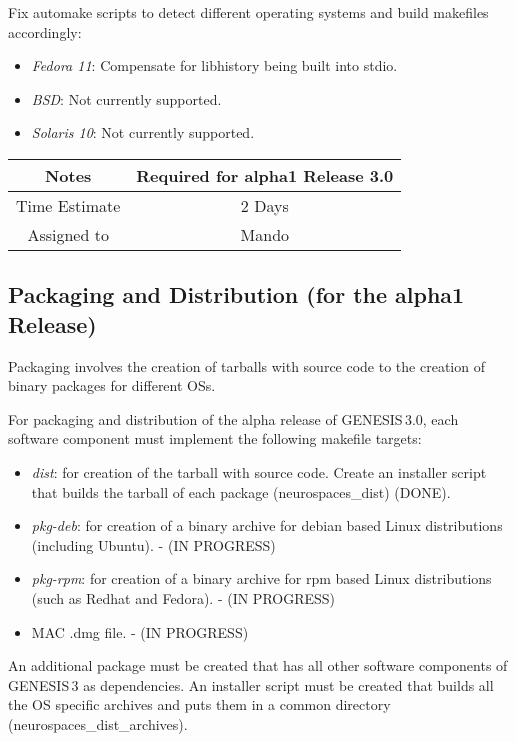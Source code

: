 \documentclass[12pt]{article}
\begin{document}
Fix automake scripts to detect different operating systems 
and build makefiles accordingly:


\begin{itemize}
\item {\it Fedora 11}: Compensate for libhistory being built into stdio.
\item {\it BSD}: Not currently supported.
\item {\it Solaris 10}: Not currently supported.
\end{itemize}

{
  \vspace{5mm}
  \centering
  \begin{tabular}{|c|c|}
    \hline
    Notes
    & Required for alpha1 Release 3.0 \\
    \hline
    Time Estimate
    & 2 Days\\
    \hline
    Assigned to
    & Mando \\
    \hline
  \end{tabular}
}


\subsection{Packaging and Distribution (for the alpha1 Release)}

Packaging involves the creation of tarballs with source code to the
creation of binary packages for different OSs.

For packaging and distribution of the alpha release of GENESIS\,3.0,
each software component must implement the following makefile targets:

\begin{itemize}
\item {\it dist}: for creation of the tarball with source code.
  Create an installer script that builds the tarball of each package
  (neurospaces\_dist) (DONE).
\item {\it pkg-deb}: for creation of a binary archive for debian based
  Linux distributions (including Ubuntu). - (IN PROGRESS)
\item {\it pkg-rpm}: for creation of a binary archive for rpm based Linux
  distributions (such as Redhat and Fedora). - (IN PROGRESS)
\item MAC .dmg file. - (IN PROGRESS)
\end{itemize}

An additional package must be created that has all other software
components of GENESIS\,3 as dependencies.  An installer script must
be created that builds all the OS specific archives and puts them in a
common directory (neurospaces\_dist\_archives).
\end{document}
